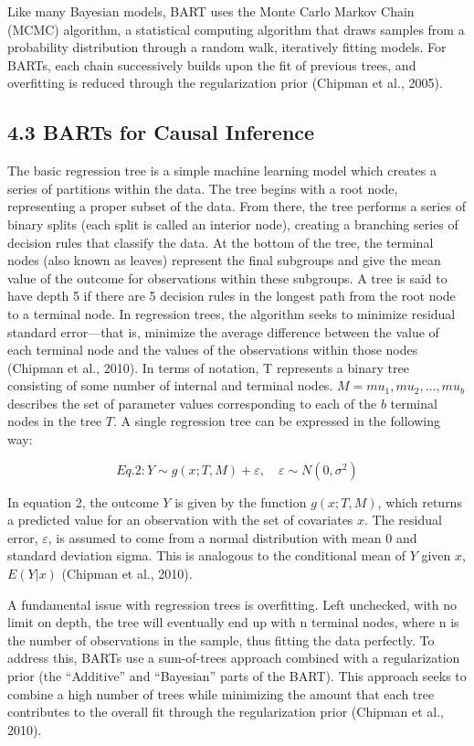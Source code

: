 \documentclass[
  12pt,
]{article}
\begin{document}
Like many Bayesian models, BART uses the Monte Carlo Markov Chain (MCMC)
algorithm, a statistical computing algorithm that draws samples from a
probability distribution through a random walk, iteratively fitting
models. For BARTs, each chain successively builds upon the fit of
previous trees, and overfitting is reduced through the regularization
prior (Chipman et al., 2005).

\subsection{4.3 BARTs for Causal
Inference}\label{barts-for-causal-inference}

The basic regression tree is a simple machine learning model which
creates a series of partitions within the data. The tree begins with a
root node, representing a proper subset of the data. From there, the
tree performs a series of binary splits (each split is called an
interior node), creating a branching series of decision rules that
classify the data. At the bottom of the tree, the terminal nodes (also
known as leaves) represent the final subgroups and give the mean value
of the outcome for observations within these subgroups. A tree is said
to have depth 5 if there are 5 decision rules in the longest path from
the root node to a terminal node. In regression trees, the algorithm
seeks to minimize residual standard error---that is, minimize the
average difference between the value of each terminal node and the
values of the observations within those nodes (Chipman et al., 2010). In
terms of notation, T represents a binary tree consisting of some number
of internal and terminal nodes. \(M = {mu_1, mu_2, …, mu_b}\) describes
the set of parameter values corresponding to each of the \(b\) terminal
nodes in the tree \(T\). A single regression tree can be expressed in
the following way:

\[Eq. 2: Y \sim g(x; T, M) + \varepsilon,\quad \varepsilon \sim N(0, \sigma^2)\]

In equation 2, the outcome \(Y\) is given by the function
\(g(x; T, M)\), which returns a predicted value for an observation with
the set of covariates \(x\). The residual error, \(\varepsilon\), is
assumed to come from a normal distribution with mean \(0\) and standard
deviation sigma. This is analogous to the conditional mean of \(Y\)
given \(x\), \(E(Y | x)\) (Chipman et al., 2010).

A fundamental issue with regression trees is overfitting. Left
unchecked, with no limit on depth, the tree will eventually end up with
n terminal nodes, where n is the number of observations in the sample,
thus fitting the data perfectly. To address this, BARTs use a
sum-of-trees approach combined with a regularization prior (the
``Additive'' and ``Bayesian'' parts of the BART). This approach seeks to
combine a high number of trees while minimizing the amount that each
tree contributes to the overall fit through the regularization prior
(Chipman et al., 2010).
\end{document}
